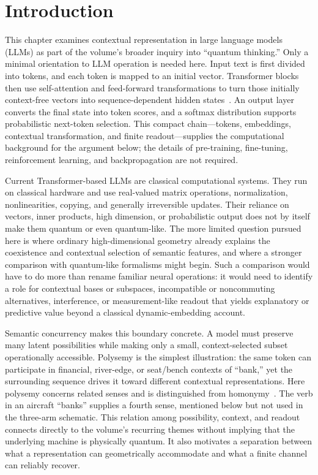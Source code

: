 \documentclass[
  aps,
  reprint,
  superscriptaddress,
  floatfix,
  nofootinbib,
  longbibliography
]{revtex4-2}
\begin{document}
\section{Introduction}
\label{sec:intro}

This chapter examines contextual representation in large language models
(LLMs) as part of the volume's broader inquiry into ``quantum thinking.''
Only a minimal orientation to LLM operation is needed here.  Input text is
first divided into tokens, and each token is mapped to an initial vector.
Transformer blocks then use self-attention and feed-forward transformations
to turn those initially context-free vectors into sequence-dependent hidden
states~\cite{Vaswani-2017-Attention}.  An output layer converts the final state into token scores, and a
softmax distribution supports probabilistic next-token selection.  This
compact chain---tokens, embeddings, contextual transformation, and finite
readout---supplies the computational background for the argument below; the
details of pre-training, fine-tuning, reinforcement learning, and
backpropagation are not required.

Current Transformer-based LLMs are classical computational systems.  They
run on classical hardware and use real-valued matrix operations,
normalization, nonlinearities, copying, and generally irreversible updates.
Their reliance on vectors, inner products, high dimension, or probabilistic
output does not by itself make them quantum or even quantum-like.  The more
limited question pursued here is where ordinary high-dimensional geometry
already explains the coexistence and contextual selection of semantic
features, and where a stronger comparison with quantum-like formalisms might
begin.  Such a comparison would have to do more than rename familiar neural
operations: it would need to identify a role for contextual bases or subspaces,
incompatible or noncommuting alternatives, interference, or
measurement-like readout that yields explanatory or predictive value beyond
a classical dynamic-embedding account.

Semantic concurrency makes this boundary concrete.  A model must preserve
many latent possibilities while making only a small, context-selected subset
operationally accessible.  Polysemy is the simplest illustration: the same
token can participate in financial, river-edge, or seat/bench contexts of
``bank,'' yet the surrounding sequence drives it toward different contextual
representations.  Here polysemy concerns related senses and is distinguished
from homonymy~\cite{pustejovsky1995}.  The verb in an aircraft ``banks'' supplies a fourth sense,
mentioned below but not used in the three-arm schematic.  This relation among
possibility, context, and readout
connects directly to the volume's recurring themes without implying that the
underlying machine is physically quantum.  It also motivates a separation
between what a representation can geometrically accommodate and what a
finite channel can reliably recover.
\end{document}
